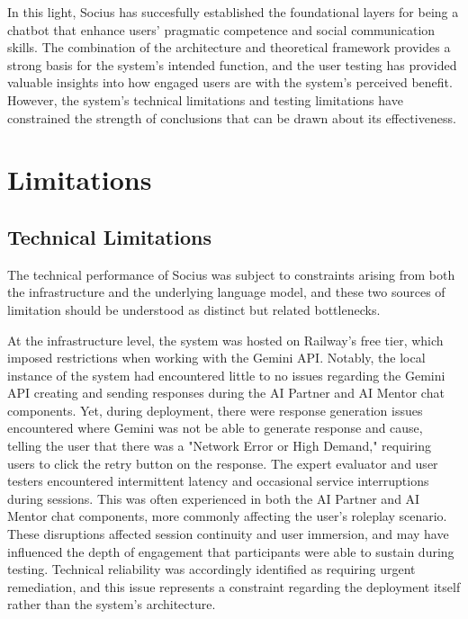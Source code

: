 In this light, Socius has succesfully established the foundational layers for being a chatbot that enhance users' pragmatic competence and social communication skills. The combination 
of the architecture and theoretical framework provides a strong basis for the system's intended function, and the user testing has provided valuable insights into how engaged users are
with the system's perceived benefit. However, the system's technical limitations and testing limitations have constrained the strength of conclusions that can be drawn about its effectiveness.

\section{Limitations}\label{sec:limitations}

\subsection{Technical Limitations}\label{subsec:tech-limitations}

The technical performance of Socius was subject to constraints arising from both
the infrastructure and the underlying language model, and these two sources of
limitation should be understood as distinct but related bottlenecks.

At the infrastructure level, the system was hosted on Railway's free tier, which
imposed restrictions when working with the Gemini API. Notably, the local 
instance of the system had encountered little to no issues regarding the
Gemini API creating and sending responses during the AI Partner and AI Mentor chat
components. Yet, during deployment, there were response generation issues encountered where
Gemini was not be able to generate response and cause, telling the user that there was a 
"Network Error or High Demand," requiring users to click the retry button on the response. The expert evaluator and user testers encountered intermittent latency and
occasional service interruptions during sessions. This was often experienced
in both the AI Partner and AI Mentor chat components, more commonly affecting
the user's roleplay scenario. These disruptions affected session continuity and user immersion, 
and may have influenced the depth of engagement that participants were able to sustain during testing. Technical
reliability was accordingly identified as requiring urgent remediation, and this issue
represents a constraint regarding the deployment itself rather than the system's architecture.

